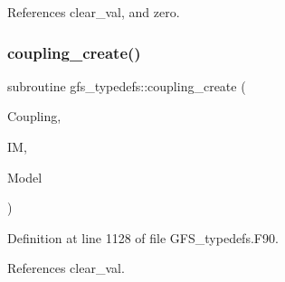 References clear\+\_\+val, and zero.

\mbox{\label{namespacegfs__typedefs_a7bff75fce20c087b5e445d7572518104}} 
\subsubsection{coupling\+\_\+create()}
{\footnotesize\ttfamily subroutine gfs\+\_\+typedefs\+::coupling\+\_\+create (\begin{DoxyParamCaption}\item[{class(\textbf{ gfs\+\_\+coupling\+\_\+type})}]{Coupling,  }\item[{integer, intent(in)}]{IM,  }\item[{type(\textbf{ gfs\+\_\+control\+\_\+type}), intent(in)}]{Model }\end{DoxyParamCaption})}



Definition at line 1128 of file G\+F\+S\+\_\+typedefs.\+F90.



References clear\+\_\+val.

\mbox{\label{namespacegfs__typedefs_af247bebcb1fac88a81caedd89dc58b61}} 
